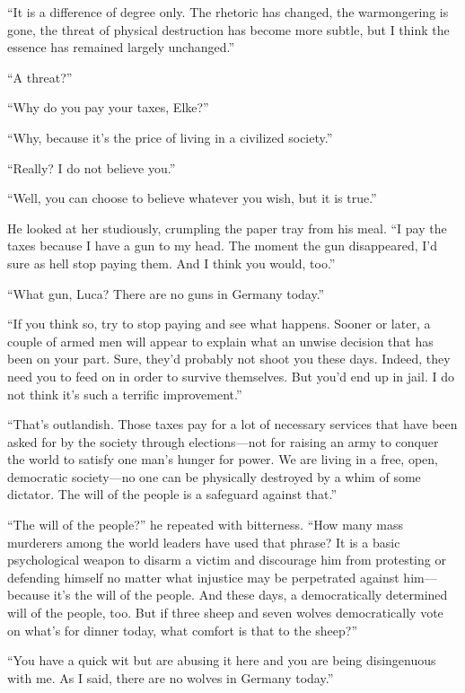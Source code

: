``It is a difference of degree only. The rhetoric has changed, the warmongering is gone, the threat of physical destruction has become more subtle, but I think the essence has remained largely unchanged.''

``A threat?''

``Why do you pay your taxes, Elke?''

``Why, because it's the price of living in a civilized society.''

``Really? I do not believe you.''

``Well, you can choose to believe whatever you wish, but it is true.''

He looked at her studiously, crumpling the paper tray from his meal. ``I pay the taxes because I have a gun to my head. The moment the gun disappeared, I'd sure as hell stop paying them. And I think you would, too.''

``What gun, Luca? There are no guns in Germany today.''

``If you think so, try to stop paying and see what happens. Sooner or later, a couple of armed men will appear to explain what an unwise decision that has been on your part. Sure, they'd probably not shoot you these days. Indeed, they need you to feed on in order to survive themselves. But you'd end up in jail. I do not think it's such a terrific improvement.''

``That's outlandish. Those taxes pay for a lot of necessary services that have been asked for by the society through elections---not for raising an army to conquer the world to satisfy one man's hunger for power. We are living in a free, open, democratic society---no one can be physically destroyed by a whim of some dictator. The will of the people is a safeguard against that.''

``The will of the people?'' he repeated with bitterness. ``How many mass murderers among the world leaders have used that phrase? It is a basic psychological weapon to disarm a victim and discourage him from protesting or defending himself no matter what injustice may be perpetrated against him---because it's the will of the people. And these days, a democratically determined will of the people, too. But if three sheep and seven wolves democratically vote on what's for dinner today, what comfort is that to the sheep?''

``You have a quick wit but are abusing it here and you are being disingenuous with me. As I said, there are no wolves in Germany today.''

